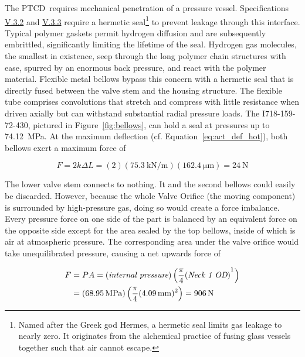 \documentclass[12pt, letterpaper]{report}%
\newcounter{mycounter}           %
\newcounter{sub}[mycounter]      %
\newcommand{\device}{PTCD}
\newcommand{\specBellowsK}{\SI{75.3}{\kilo \newton \per \meter}} %
\newcommand{\specBellowsBurst}{\SI{74.12}{\mega \pascal}} %
\newcommand{\specPressure}{\SI{68.95}{\mega \pascal}}%
\newcommand{\specActDefHot}{\SI{162.4}{\micro \meter}}
\newcommand{\specref}[1]{\hyperref[tab:specs]{#1}}
\begin{document}
		The \device\ requires mechanical penetration of a pressure vessel. Specifications \specref{V.3.2} and \specref{V.3.3} require a hermetic seal\footnote{
			Named after the Greek god Hermes\cite{ref_wilton_hermetic}, a hermetic seal limits gas leakage to nearly zero.
			It originates from the alchemical practice of fusing glass vessels together such that air cannot escape\cite{ref_gesner_1559}.
		} to prevent leakage through this interface.
		Typical polymer gaskets permit hydrogen diffusion and are subsequently embrittled, significantly limiting the lifetime of the seal.
		Hydrogen gas molecules, the smallest in existence, seep through the long polymer chain structures with ease, spurred by an enormous back pressure, and react with the polymer material.
		Flexible metal bellows bypass this concern with a hermetic seal that is directly fused between the valve stem and the housing structure.
		The flexible tube comprises convolutions that stretch and compress with little resistance when driven axially but can withstand substantial radial pressure loads.
		The I718-159-72-430, pictured in Figure~\ref{fig:bellows}, can hold a seal at pressures up to \specBellowsBurst.
		At the maximum deflection (cf. Equation~\eqref{eq:act_def_hot}), both bellows exert a maximum force\cite{ref_Young_Freedman, ref_miniflex_catalog} of

		\begin{equation}
			F = 2 k \Delta L = (2) \left(\specBellowsK \right) \left(\specActDefHot \right) = \SI{24}{\newton}
			\label{eq:bellow_F}
		\end{equation}

		The lower valve stem connects to nothing. It and the second bellows could easily be discarded.
		However, because the whole Valve Orifice (the moving component) is surrounded by high-pressure gas, doing so would create a force imbalance.
		Every pressure force on one side of the part is balanced by an equivalent force on the opposite side except for the area sealed by the top bellows,
		inside of which is air at atmospheric pressure.
		The corresponding area under the valve orifice would take unequilibrated pressure, causing a net upwards force of

		\begin{equation}
			\begin{aligned}
				F &= P A = (\textit{internal pressure}) \left( \frac{\pi}{4} (\textit{Neck 1 OD})^{\footnotemark} \right) \\
				& = (\specPressure) \left( \frac{\pi}{4} (\SI{4.09}{\milli\meter})^2 \right) = \SI{906}{\newton}
			\end{aligned}
		\end{equation}
\end{document}
